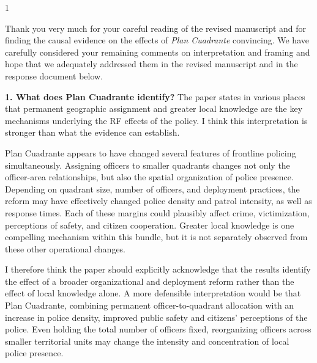 \begin{bibunit}

\begin{spacing}{1}
\justifying \color{darkdarkgray} \noindent

Thank you very much for your careful reading of the revised manuscript and for finding the causal evidence on the effects of \emph{Plan Cuadrante} convincing. We have carefully considered your remaining comments on interpretation and framing and hope that we adequately addressed them in the revised manuscript and in the response document below.

\end{spacing}



\begin{refcomment}

\textbf{1. What does Plan Cuadrante identify?} The paper states in various places that permanent geographic assignment and greater local knowledge are the key mechanisms underlying the RF effects of the policy. I think this interpretation is stronger than what the evidence can establish.

Plan Cuadrante appears to have changed several features of frontline policing simultaneously. Assigning officers to smaller quadrants changes not only the officer-area relationships, but also the spatial organization of police presence. Depending on quadrant size, number of officers, and deployment practices, the reform may have effectively changed police density and patrol intensity, as well as response times. Each of these margins could plausibly affect crime, victimization, perceptions of safety, and citizen cooperation. Greater local knowledge is one compelling mechanism within this bundle, but it is not separately observed from these other operational changes.

I therefore think the paper should explicitly acknowledge that the results identify the effect of a broader organizational and deployment reform rather than the effect of local knowledge alone. A more defensible interpretation would be that Plan Cuadrante, combining permanent officer-to-quadrant allocation with an increase in police density, improved public safety and citizens' perceptions of the police. Even holding the total number of officers fixed, reorganizing officers across smaller territorial units may change the intensity and concentration of local police presence.


\end{refcomment}
\end{bibunit}
